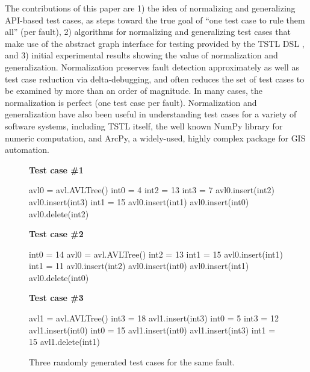The contributions of this paper are 1) the idea of normalizing and
generalizing API-based test cases, as steps toward the true goal of
``one test case to rule them all'' (per fault), 2) algorithms for
normalizing and generalizing test cases that make use of the abstract
graph interface for testing provided by the TSTL
\cite{tstl,NFM15,ISSTA15} DSL \cite{Fow10}, and 3) initial
experimental results showing the value of normalization and
generalization.  Normalization preserves fault
detection approximately as well as test case reduction via
delta-debugging, and often reduces the set of test cases to be
examined by more than an order of magnitude. In many cases, the
normalization is perfect (one test case per fault).  Normalization and generalization have also been useful in
understanding test cases for a variety of software systems, including
TSTL itself, the well known NumPy library for numeric computation, and
ArcPy, a widely-used, highly complex package for GIS automation.

\begin{figure}
{\scriptsize
{\bf Test case \#1}
\begin{code}
avl0 = avl.AVLTree() 
int0 = 4 
int2 = 13 
int3 = 7 
avl0.insert(int2) 
avl0.insert(int3) 
int1 = 15 
avl0.insert(int1) 
avl0.insert(int0) 
avl0.delete(int2)
\end{code}
{\bf Test case \#2}
\begin{code}
int0 = 14 
avl0 = avl.AVLTree() 
int2 = 13 
int1 = 15 
avl0.insert(int1) 
int1 = 11 
avl0.insert(int2) 
avl0.insert(int0) 
avl0.insert(int1) 
avl0.delete(int0) 
\end{code}
{\bf Test case \#3}
\begin{code}
avl1 = avl.AVLTree() 
int3 = 18 
avl1.insert(int3) 
int0 = 5 
int3 = 12 
avl1.insert(int0) 
int0 = 15 
avl1.insert(int0) 
avl1.insert(int3) 
int1 = 15 
avl1.delete(int1) 
\end{code}
}
\caption {Three randomly generated test cases for the same fault.}
\label{threetests}
\end{figure}

